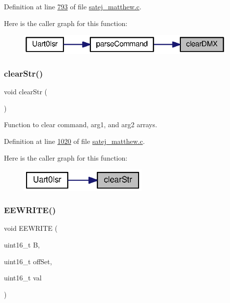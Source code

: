 Definition at line \mbox{\hyperlink{satej__matthew_8c_source_l00793}{793}} of file \mbox{\hyperlink{satej__matthew_8c_source}{satej\+\_\+matthew.\+c}}.

Here is the caller graph for this function\+:
\nopagebreak
\begin{figure}[H]
\begin{center}
\leavevmode
\includegraphics[width=309pt]{satej__matthew_8c_a90f05ed3280bc7f2e971ed7216028960_icgraph}
\end{center}
\end{figure}
\mbox{\label{satej__matthew_8c_a595edd7ef79a70fc4dccbca4b2cf0deb}} 
\subsubsection{\texorpdfstring{clearStr()}{clearStr()}}
{\footnotesize\ttfamily void clear\+Str (\begin{DoxyParamCaption}{ }\end{DoxyParamCaption})}



Function to clear command, arg1, and arg2 arrays. 



Definition at line \mbox{\hyperlink{satej__matthew_8c_source_l01020}{1020}} of file \mbox{\hyperlink{satej__matthew_8c_source}{satej\+\_\+matthew.\+c}}.

Here is the caller graph for this function\+:
\nopagebreak
\begin{figure}[H]
\begin{center}
\leavevmode
\includegraphics[width=180pt]{satej__matthew_8c_a595edd7ef79a70fc4dccbca4b2cf0deb_icgraph}
\end{center}
\end{figure}
\mbox{\label{satej__matthew_8c_a31b9c21cfe092a5574eb605046951401}} 
\subsubsection{\texorpdfstring{EEWRITE()}{EEWRITE()}}
{\footnotesize\ttfamily void E\+E\+W\+R\+I\+TE (\begin{DoxyParamCaption}\item[{uint16\+\_\+t}]{B,  }\item[{uint16\+\_\+t}]{off\+Set,  }\item[{uint16\+\_\+t}]{val }\end{DoxyParamCaption})}



